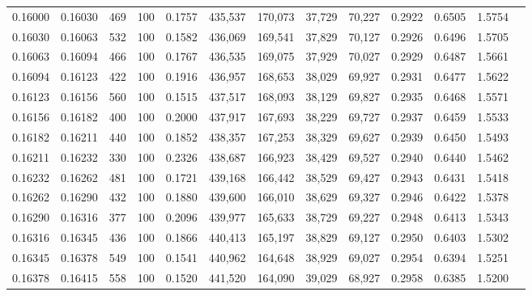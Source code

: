 \begin{tabular}{rrrrrrrrrrrrr}
0.16000 & 0.16030 &   469 & 100 &                                     0.1757 & 435,537 & 170,073 &  37,729 &  70,227 & 0.2922 & 0.6505 & 1.5754 \\
0.16030 & 0.16063 &   532 & 100 &                                     0.1582 & 436,069 & 169,541 &  37,829 &  70,127 & 0.2926 & 0.6496 & 1.5705 \\
0.16063 & 0.16094 &   466 & 100 &                                     0.1767 & 436,535 & 169,075 &  37,929 &  70,027 & 0.2929 & 0.6487 & 1.5661 \\
0.16094 & 0.16123 &   422 & 100 &                                     0.1916 & 436,957 & 168,653 &  38,029 &  69,927 & 0.2931 & 0.6477 & 1.5622 \\
0.16123 & 0.16156 &   560 & 100 &                                     0.1515 & 437,517 & 168,093 &  38,129 &  69,827 & 0.2935 & 0.6468 & 1.5571 \\
0.16156 & 0.16182 &   400 & 100 &                                     0.2000 & 437,917 & 167,693 &  38,229 &  69,727 & 0.2937 & 0.6459 & 1.5533 \\
0.16182 & 0.16211 &   440 & 100 &                                     0.1852 & 438,357 & 167,253 &  38,329 &  69,627 & 0.2939 & 0.6450 & 1.5493 \\
0.16211 & 0.16232 &   330 & 100 &                                     0.2326 & 438,687 & 166,923 &  38,429 &  69,527 & 0.2940 & 0.6440 & 1.5462 \\
0.16232 & 0.16262 &   481 & 100 &                                     0.1721 & 439,168 & 166,442 &  38,529 &  69,427 & 0.2943 & 0.6431 & 1.5418 \\
0.16262 & 0.16290 &   432 & 100 &                                     0.1880 & 439,600 & 166,010 &  38,629 &  69,327 & 0.2946 & 0.6422 & 1.5378 \\
0.16290 & 0.16316 &   377 & 100 &                                     0.2096 & 439,977 & 165,633 &  38,729 &  69,227 & 0.2948 & 0.6413 & 1.5343 \\
0.16316 & 0.16345 &   436 & 100 &                                     0.1866 & 440,413 & 165,197 &  38,829 &  69,127 & 0.2950 & 0.6403 & 1.5302 \\
0.16345 & 0.16378 &   549 & 100 &                                     0.1541 & 440,962 & 164,648 &  38,929 &  69,027 & 0.2954 & 0.6394 & 1.5251 \\
0.16378 & 0.16415 &   558 & 100 &                                     0.1520 & 441,520 & 164,090 &  39,029 &  68,927 & 0.2958 & 0.6385 & 1.5200 \\

\end{tabular}
